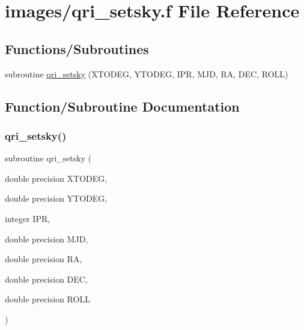 \hypertarget{qri__setsky_8f}{}\section{images/qri\+\_\+setsky.f File Reference}
\label{qri__setsky_8f}
\subsection*{Functions/\+Subroutines}
\begin{DoxyCompactItemize}
\item 
subroutine \hyperlink{qri__setsky_8f_aa63e37d7f798411e5f73e6d1523f9936}{qri\+\_\+setsky} (X\+T\+O\+D\+EG, Y\+T\+O\+D\+EG, I\+PR, M\+JD, RA, D\+EC, R\+O\+LL)
\end{DoxyCompactItemize}


\subsection{Function/\+Subroutine Documentation}
\mbox{\label{qri__setsky_8f_aa63e37d7f798411e5f73e6d1523f9936}} 
\subsubsection{\texorpdfstring{qri\+\_\+setsky()}{qri\_setsky()}}
{\footnotesize\ttfamily subroutine qri\+\_\+setsky (\begin{DoxyParamCaption}\item[{double precision}]{X\+T\+O\+D\+EG,  }\item[{double precision}]{Y\+T\+O\+D\+EG,  }\item[{integer}]{I\+PR,  }\item[{double precision}]{M\+JD,  }\item[{double precision}]{RA,  }\item[{double precision}]{D\+EC,  }\item[{double precision}]{R\+O\+LL }\end{DoxyParamCaption})}

